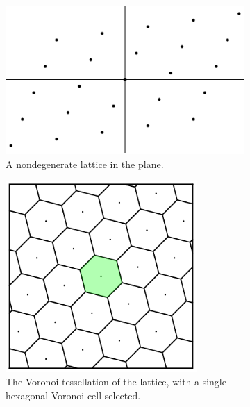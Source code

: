 \documentclass[12pt,twoside]{reedthesis}
\theoremstyle{definition}
\begin{document}
\begin{figure}[t!]
  \centering
  \begin{subfigure}[t]{0.45\textwidth}
    \centering
    \includegraphics[width=\textwidth]{figures/subset_homeomorphism_step_1.pdf}
    \caption{A nondegenerate lattice in the plane.}
  \end{subfigure}
  \hfill
  \begin{subfigure}[t]{0.45\textwidth}
    \centering
    \includegraphics[width=0.8\textwidth]{figures/subset_homeomorphism_step_2.pdf}
    \caption{The Voronoi tessellation of the lattice, with a single hexagonal Voronoi cell selected.}
  \end{subfigure}
  \hfill
  \begin{subfigure}[t]{0.45\textwidth}
    \centering

\end{subfigure}
\end{figure}
\end{document}
